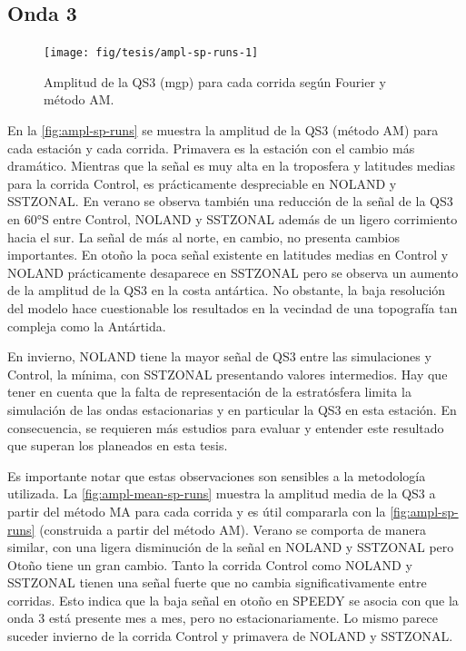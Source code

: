 \documentclass[spanish,a4paper,12pt,oneside]{book}
\begin{document}
\hypertarget{onda-3-2}{%
\subsection{Onda 3}\label{onda-3-2}}

\begin{landscape}\begin{figure}

{\centering \texttt{[image: fig/tesis/ampl-sp-runs-1]} 

}

\caption{Amplitud de la QS3 (mgp) para cada corrida según Fourier y método AM.}\label{fig:ampl-sp-runs}
\end{figure}
\end{landscape}

En la \autoref{fig:ampl-sp-runs} se muestra la amplitud de la QS3
(método AM) para cada estación y cada corrida. Primavera es la estación
con el cambio más dramático. Mientras que la señal es muy alta en la
troposfera y latitudes medias para la corrida Control, es prácticamente
despreciable en NOLAND y SSTZONAL. En verano se observa también una
reducción de la señal de la QS3 en 60°S entre Control, NOLAND y SSTZONAL
además de un ligero corrimiento hacia el sur. La señal de más al norte,
en cambio, no presenta cambios importantes. En otoño la poca señal
existente en latitudes medias en Control y NOLAND prácticamente
desaparece en SSTZONAL pero se observa un aumento de la amplitud de la
QS3 en la costa antártica. No obstante, la baja resolución del modelo
hace cuestionable los resultados en la vecindad de una topografía tan
compleja como la Antártida.

En invierno, NOLAND tiene la mayor señal de QS3 entre las simulaciones y
Control, la mínima, con SSTZONAL presentando valores intermedios. Hay
que tener en cuenta que la falta de representación de la estratósfera
limita la simulación de las ondas estacionarias y en particular la QS3
en esta estación. En consecuencia, se requieren más estudios para
evaluar y entender este resultado que superan los planeados en esta
tesis.

Es importante notar que estas observaciones son sensibles a la
metodología utilizada. La \autoref{fig:ampl-mean-sp-runs} muestra la
amplitud media de la QS3 a partir del método MA para cada corrida y es
útil compararla con la \autoref{fig:ampl-sp-runs} (construida a partir
del método AM). Verano se comporta de manera similar, con una ligera
disminución de la señal en NOLAND y SSTZONAL pero Otoño tiene un gran
cambio. Tanto la corrida Control como NOLAND y SSTZONAL tienen una señal
fuerte que no cambia significativamente entre corridas. Esto indica que
la baja señal en otoño en SPEEDY se asocia con que la onda 3 está
presente mes a mes, pero no estacionariamente. Lo mismo parece suceder
invierno de la corrida Control y primavera de NOLAND y SSTZONAL.
\end{document}

